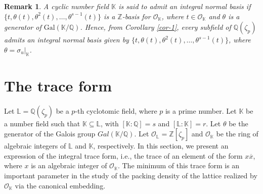 \documentclass[10pt,a4paper]{amsart}
\newtheorem{remark}[theorem]{Remark}
\begin{document}
\begin{remark} \label{rem-0} A cyclic number field $\mathbb{K}$ is said to admit an integral normal basis if $\{t,\theta(t),\theta^2(t),\ldots,\theta^{s-1}(t)\}$ is a $\mathbb{Z}$-basis for $\mathcal{O}_{\mathbb{K}}$, where $t\in \mathcal{O}_\mathbb{K}$ and $\theta$ is a generator of $\textrm{Gal}(\mathbb{K}/\mathbb{Q})$. Hence, from Corollary \ref{cor-1}, every subfield of $\mathbb{Q}(\zeta_p)$ admits an integral normal basis given by $\{t,\theta(t),\theta^2(t),\ldots,\theta^{s-1}(t)\}$, where $\theta=\sigma_{u}|_\mathbb{K}$. \end{remark}

\section{The trace form} \label{sec-3}

Let $\mathbb{L}=\mathbb{Q}(\zeta_p)$ be a $p$-th cyclotomic field, where $p$ is a prime number. Let $\mathbb{K}$ be a number field such that $\mathbb{K}\subseteq\mathbb{L}$, with $[\mathbb{K}:\mathbb{Q}]=s$ and $[\mathbb{L}:\mathbb{K}]=r$. Let $\theta$ be the generator of the Galois group $Gal(\mathbb{K}/\mathbb{Q})$. Let $\mathcal{O}_{\mathbb{L}}=\mathbb{Z}[\zeta_p]$ and $\mathcal{O}_{\mathbb{K}}$ be the ring of algebraic integers of $\mathbb{L}$ and $\mathbb{K}$, respectively.
In this section, we present an expression of the integral trace form, i.e., the trace of an element of the form $x\overline{x}$, where $x$ is an algebraic integer of $\mathcal{O}_{\mathbb{K}}$. The minimum of this trace form is an important parameter in the study of the packing density of the lattice realized by $\mathcal{O}_\mathbb{K}$ via the canonical embedding.
\end{document}
